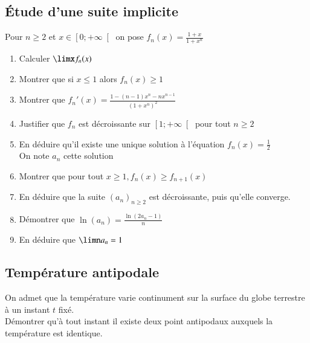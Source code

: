 \documentclass[oneside,12pt]{article}          %
\begin{document}
\subsection{Étude d'une suite implicite}
Pour $n\geq2$ et $x\in\left[0;+\infty\right[$ on pose $f_n(x)=\frac{1+x}{1+x^n}$
\begin{enumerate}
    \item Calculer $\limx f_n(x)$
    \item Montrer que si $x\leq1$ alors $f_n(x)\geq1$
    \item Montrer que $f_n'(x)=\frac{1-(n-1)x^n-nx^{n-1}}{\left(1+x^n\right)^2}$
    \item Justifier que $f_n$ est décroissante sur $\left[1;+\infty\right[$ pour tout $n\geq2$
    \item En déduire qu'il existe une unique solution à l'équation $f_n(x)=\frac{1}{2}$\\
    On note $a_n$ cette solution
    \item Montrer que pour tout $x\geq1 , f_n(x)\geq f_{n+1}(x)$
    \item En déduire que la suite $(a_n)_{n\geq2}$ est décroissante, puis qu'elle converge.
    \item Démontrer que $\ln(a_n)=\frac{\ln(2a_n-1)}{n}$
    \item En déduire que $\limn a_n=1$
\end{enumerate}



\subsection{Température antipodale}
On admet que la température varie continument sur la surface du globe terrestre à un instant $t$ fixé.\\
Démontrer  qu'à tout instant il existe deux point antipodaux auxquels la température est identique.
\end{document}
